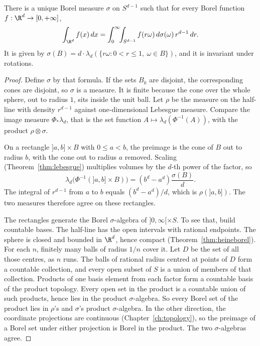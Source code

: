 \begin{theorem}\label{thm:polar}
There is a unique Borel measure $\sigma$ on $S^{d-1}$ such that for every Borel function $f:\R^d\to[0,+\infty]$,
\[\int_{\R^d}f(x)\,dx=\int_0^\infty\!\!\int_{S^{d-1}}f(r\omega)\,d\sigma(\omega)\,r^{d-1}\,dr.\]
It is given by $\sigma(B)=d\cdot\lambda_d(\{r\omega:0<r\le 1,\ \omega\in B\})$, and it is invariant under rotations.
\end{theorem}
\begin{proof}
Define $\sigma$ by that formula. If the sets $B_k$ are disjoint, the corresponding cones are disjoint, so $\sigma$ is a measure. It is finite because the cone over the whole sphere, out to radius $1$, sits inside the unit ball. Let $\rho$ be the measure on the half-line with density $r^{d-1}$ against one-dimensional Lebesgue measure. Compare the image measure $\Phi_*\lambda_d$, that is the set function $A\mapsto\lambda_d(\Phi^{-1}(A))$, with the product $\rho\otimes\sigma$.

On a rectangle $]a,b]\times B$ with $0\le a<b$, the preimage is the cone of $B$ out to radius $b$, with the cone out to radius $a$ removed. Scaling (Theorem~\ref{thm:lebesgue}) multiplies volumes by the $d$-th power of the factor, so
\[
\lambda_d\bigl(\Phi^{-1}(]a,b]\times B)\bigr)=(b^d-a^d)\frac{\sigma(B)}d.
\]
The integral of $r^{d-1}$ from $a$ to $b$ equals $(b^d-a^d)/d$, which is $\rho(]a,b])$. The two measures therefore agree on these rectangles.

The rectangles generate the Borel $\sigma$-algebra of $]0,\infty[\times S$. To see that, build countable bases. The half-line has the open intervals with rational endpoints. The sphere is closed and bounded in $\R^d$, hence compact (Theorem~\ref{thm:heineborel}). For each $n$, finitely many balls of radius $1/n$ cover it. Let $D$ be the set of all those centres, as $n$ runs. The balls of rational radius centred at points of $D$ form a countable collection, and every open subset of $S$ is a union of members of that collection. Products of one basis element from each factor form a countable basis of the product topology. Every open set in the product is a countable union of such products, hence lies in the product $\sigma$-algebra. So every Borel set of the product lies in $\rho$'s and $\sigma$'s product $\sigma$-algebra. In the other direction, the coordinate projections are continuous (Chapter~\ref{ch:topology}), so the preimage of a Borel set under either projection is Borel in the product. The two $\sigma$-algebras agree.


\end{proof}
